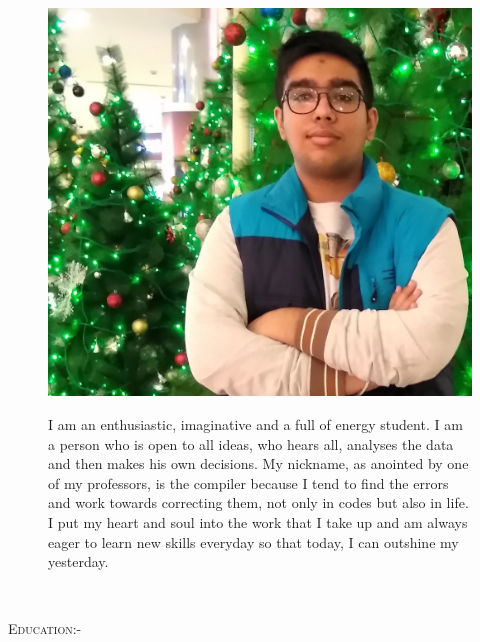 \documentclass[11pt]{article}
\begin{document}
\begin{figure}[ht]
\begin{minipage}[b]{0.45\linewidth}
\centering
\includegraphics[scale=0.095]{photo2.jpg}
\end{minipage}
\hspace{0.5cm}
\begin{minipage}[b]{0.45\linewidth}
\flushleft
\begin{small}
I am an enthusiastic, imaginative and a full of energy student. I am a person who is open to all ideas, who hears all, analyses the data and then makes his own decisions. My nickname, as anointed by one of my professors, is the compiler because I tend to find the errors and work towards correcting them, not only in codes but also in life. I put my heart and soul into the work that I take up and am always eager to learn new skills everyday so that today, I can outshine my yesterday.\\
{}
\end{small}
\end{minipage}
\end{figure}\\
\begin{large}
\textsc{Education:-}
\end{large}
\end{document}
